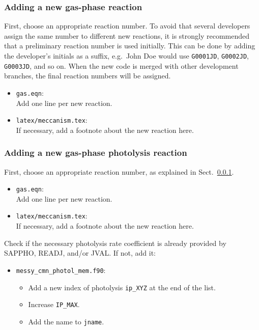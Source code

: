 \documentclass[twoside]{article}
\def\nosep{\setlength\parsep{0mm}\setlength\topsep{0mm}\setlength\itemsep{0mm}}
\begin{document}
\subsubsection{Adding a new gas-phase reaction}
\label{sec:addgprxn}

First, choose an appropriate reaction number. To avoid that several
developers assign the same number to different new reactions, it is
strongly recommended that a preliminary reaction number is used
initially. This can be done by adding the developer's initials as a
suffix, e.g.\ John Doe would use \verb|G0001JD|, \verb|G0002JD|,
\verb|G0003JD|, and so on. When the new code is merged with other
development branches, the final reaction numbers will be assigned.

\begin{itemize}\nosep
\item \verb|gas.eqn|:\\
  Add one line per new reaction.
\end{itemize}

\begin{itemize}\nosep
\item \verb|latex/meccanism.tex|:\\
  If necessary, add a footnote about the new reaction here.
\end{itemize}

\subsubsection{Adding a new gas-phase photolysis reaction}

First, choose an appropriate reaction number, as explained in
Sect.~\ref{sec:addgprxn}.

\begin{itemize}\nosep
\item \verb|gas.eqn|:\\
  Add one line per new reaction.
\end{itemize}

\begin{itemize}\nosep
\item \verb|latex/meccanism.tex|:\\
  If necessary, add a footnote about the new reaction here.
\end{itemize}

Check if the necessary photolysis rate coefficient is already provided
by SAPPHO, READJ, and/or JVAL. If not, add it:

\begin{itemize}\nosep
\item \verb|messy_cmn_photol_mem.f90|:\\
  \begin{itemize}\nosep
  \item Add a new index of photolysis \verb|ip_XYZ| at the end of the
    list.
  \item Increase \verb|IP_MAX|.
  \item Add the name to \verb|jname|.
  \end{itemize}
\end{itemize}
\end{document}
